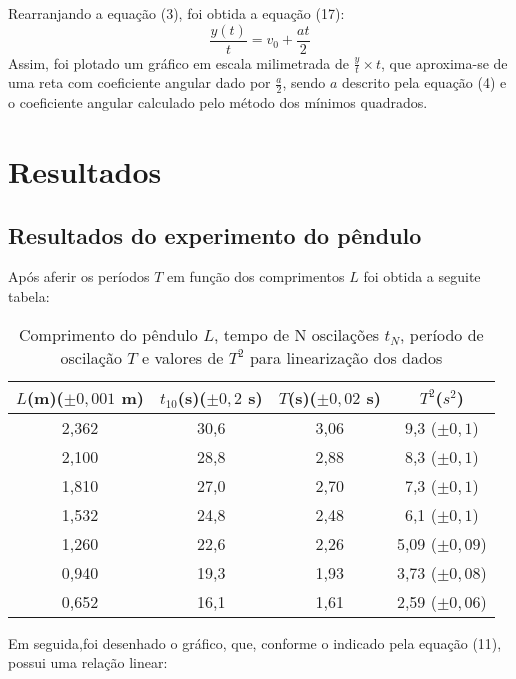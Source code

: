 \documentclass[12pt, letterpaper]{article}
\begin{document}
    Rearranjando a equação (3), foi obtida a equação (17):
    \begin{equation}
        \frac{y(t)}{t} = v_{0} + \frac{at}{2}
    \end{equation}
    Assim, foi plotado um gráfico em escala milimetrada de $\frac{y}{t} \times t$, que aproxima-se de uma reta com coeficiente angular dado por $\frac{a}{2}$, sendo $a$ descrito pela equação (4) e o coeficiente angular calculado pelo método dos mínimos quadrados.
\newpage
\section{Resultados}
    \subsection{Resultados do experimento do pêndulo}
    Após aferir os períodos $T$ em função dos comprimentos $L$ foi obtida a seguite tabela:

    
    \begin{table}[!h]
    \centering
    \caption{Comprimento do pêndulo $L$, tempo de N oscilações $t_{N}$, período de
oscilação $T$ e valores de $T^2$ para linearização dos dados}
     \begin{tabular}{| c | c | c | c |}
   \hline
     $L$(m)($\pm 0,001$ m)  & $t_{10}$(s)($\pm 0,2$ s) &  $T$(s)($\pm 0,02$ s) & $T^2$($s^2$)   \\
    \hline
       2,362   &   30,6   &   3,06 & 9,3 ($\pm 0,1$)     \\
   \hline    
       2,100   &   28,8  &   2,88  & 8,3 ($\pm 0,1$)    \\
   \hline    
       1,810   &   27,0  &   2,70  & 7,3 ($\pm 0,1$)   \\
   \hline    
       1,532   &   24,8  &   2,48  & 6,1 ($\pm 0,1$) \\
   \hline    
       1,260   &   22,6  &   2,26  & 5,09 ($\pm 0,09$) \\
   \hline    
        0,940   &   19,3  &   1,93  & 3,73 ($\pm 0,08$) \\
   \hline    
        0,652    &  16,1  &   1,61  & 2,59 ($\pm 0,06$) \\
   \hline
\end{tabular} 
    \label{tab:1}
    \end{table}

    
 Em seguida,foi desenhado o gráfico, que, conforme o indicado pela equação (11), possui uma relação linear:
\end{document}
